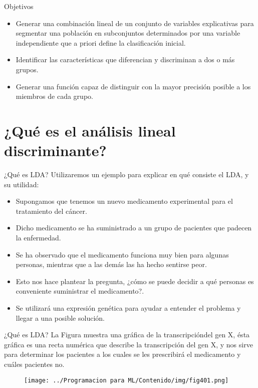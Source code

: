 \documentclass[11pt,aspectratio=169]{beamer}
\begin{document}
\begin{frame}{Objetivos}
\begin{itemize}
	\item Generar una combinación lineal de un conjunto de variables explicativas para segmentar una población en subconjuntos determinados por una 
		variable independiente que a priori define la clasificación inicial.\pause
	\item Identificar las características que diferencian y discriminan a dos o más grupos.\pause
	\item Generar una función capaz de distinguir con la mayor precisión posible a los miembros de cada grupo.
\end{itemize}
\end{frame}

\section{¿Qué es el análisis lineal discriminante?}

\begin{frame}{¿Qué es LDA?}
Utilizaremos un ejemplo para explicar en qué consiste el LDA, y su utilidad:
\begin{itemize}
	\item Supongamos que tenemos un nuevo medicamento experimental para el tratamiento del cáncer.\pause
	\item Dicho medicamento se ha suministrado a un grupo de pacientes que padecen la enfermedad.\pause 
	\item Se ha observado que el medicamento funciona muy bien para algunas personas, mientras que a las demás las ha hecho sentirse peor.\pause
	\item Esto nos hace plantear la pregunta, ¿cómo se puede decidir a qué personas es conveniente suministrar el medicamento?.\pause
	\item Se utilizará una expresión genética para ayudar a entender el problema y llegar a una posible solución.
\end{itemize}
\end{frame}

\begin{frame}{¿Qué es LDA?}
La Figura muestra una gráfica de la transcripción\footnotemark[1] del gen X, ésta gráfica es una recta numérica que describe la transcripción del gen X, y nos 
sirve para determinar los pacientes a los cuales se les prescribirá el medicamento y cuáles pacientes no.
\begin{figure}[H]
	\centering
	\texttt{[image: ../Programacion para ML/Contenido/img/fig401.png]}
\end{figure}
\end{frame}
\end{document}
